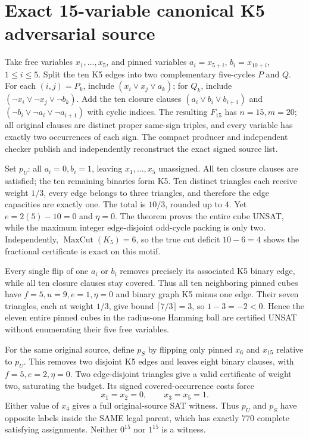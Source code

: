 \documentclass[11pt]{article}
\begin{document}
\section{Exact 15-variable canonical K5 adversarial source}
Take free variables $x_1,\ldots,x_5$, and pinned variables $a_i=x_{5+i}$, $b_i=x_{10+i}$, $1\le i\le5$. Split the ten K5 edges into two complementary five-cycles $P$ and $Q$. For each $(i,j)=P_k$, include $(x_i\lor x_j\lor a_k)$; for $Q_k$, include $(\neg x_i\lor\neg x_j\lor\neg b_k)$. Add the ten closure clauses $(a_i\lor b_i\lor b_{i+1})$ and $(\neg b_i\lor\neg a_i\lor\neg a_{i+1})$ with cyclic indices. The resulting $F_{15}$ has $n=15,m=20$; all original clauses are distinct proper same-sign triples, and every variable has exactly two occurrences of each sign. The compact producer and independent checker publish and independently reconstruct the exact signed source list.

Set $p_U$: all $a_i=0,b_i=1$, leaving $x_1,\ldots,x_5$ unassigned. All ten closure clauses are satisfied; the ten remaining binaries form K5. Ten distinct triangles each receive weight $1/3$, every edge belongs to three triangles, and therefore the edge capacities are exactly one. The total is $10/3$, rounded up to $4$. Yet $e=2(5)-10=0$ and $\eta=0$. The theorem proves the entire cube UNSAT, while the maximum integer edge-disjoint odd-cycle packing is only two. Independently, $\operatorname{MaxCut}(K_5)=6$, so the true cut deficit $10-6=4$ shows the fractional certificate is exact on this motif.

Every single flip of one $a_i$ or $b_i$ removes precisely its associated K5 binary edge, while all ten closure clauses stay covered. Thus all ten neighboring pinned cubes have $f=5,u=9,e=1,\eta=0$ and binary graph K5 minus one edge. Their seven triangles, each at weight $1/3$, give bound $\lceil7/3\rceil=3$, so $1-3=-2<0$. Hence the eleven entire pinned cubes in the radius-one Hamming ball are certified UNSAT without enumerating their five free variables.

For the same original source, define $p_S$ by flipping only pinned $x_6$ and $x_{15}$ relative to $p_U$. This removes two disjoint K5 edges and leaves eight binary clauses, with $f=5,e=2,\eta=0$. Two edge-disjoint triangles give a valid certificate of weight two, saturating the budget. Its signed covered-occurrence costs force
\[
x_1=x_2=0,\qquad x_3=x_5=1.
\]
Either value of $x_4$ gives a full original-source SAT witness. Thus $p_U$ and $p_S$ have opposite labels inside the SAME legal parent, which has exactly 770 complete satisfying assignments. Neither $0^{15}$ nor $1^{15}$ is a witness.
\end{document}
